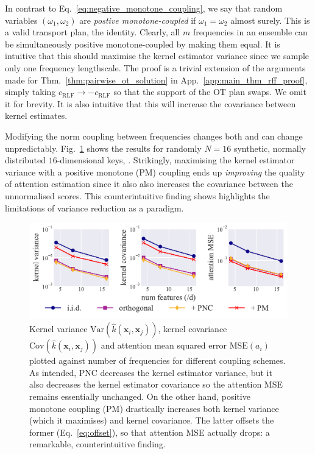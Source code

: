 In contrast to Eq.~\ref{eq:negative_monotone_coupling}, we say that random variables $(\omega_1,\omega_2)$ are \emph{postive monotone-coupled} if $\omega_1 = \omega_2$ almost surely.
This is a valid transport plan, the identity.
Clearly, all $m$ frequencies in an ensemble can be simultaneously positive monotone-coupled by making them equal.
It is intuitive that this should maximise the kernel estimator variance since we sample only one frequency lengthscale.
The proof is a trivial extension of the arguments made for Thm.~\ref{thm:pairwise_ot_solution} in App.~\ref{app:main_thm_rff_proof}, simply taking $c_\textrm{RLF} \to - c_\textrm{RLF}$ so that the support of the OT plan swaps.
We omit it for brevity.
It is also intuitive that this will increase the covariance between kernel estimates.

Modifying the norm coupling between frequencies changes both  and  can change unpredictably. 
Fig.~\ref{fig:var_fig} shows the results for randomly $N=16$ synthetic, normally distributed $16$-dimensional keys, .
Strikingly, maximising the kernel estimator variance with a positive monotone (PM) coupling ends up \emph{improving} the quality of attention estimation since it also also increases the covariance between the unnormalised scores.
This counterintuitive finding shows highlights the limitations of variance reduction as a paradigm.

\begin{figure}
    \centering
    \includegraphics[width=0.65\linewidth]{images/attention_variance.pdf}
    \caption{Kernel variance $\textrm{Var}(\widehat{k}(\boldsymbol{x}_i, \boldsymbol{x}_j))$, kernel covariance $\textrm{Cov}(\widehat{k}(\boldsymbol{x}_i, \boldsymbol{x}_{j}))$ and attention mean squared error $\textrm{MSE}(a_i)$ plotted against number of frequencies for different coupling schemes. 
    As intended, PNC decreases the kernel estimator variance, 
    but it also decreases the kernel estimator covariance so the attention MSE remains essentially unchanged. 
    On the other hand, positive monotone coupling (PM) drastically increases both kernel variance (which it maximises) and kernel covariance. 
    The latter offsets the former (Eq.~\ref{eq:offset}), so that attention MSE actually drops: a remarkable, counterintuitive finding.}
    \label{fig:var_fig}
\end{figure}

